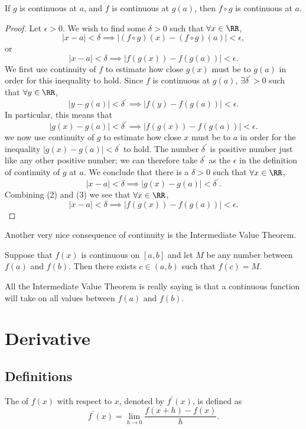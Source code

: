 \begin{proposition}
If $g$ is continuous at $a$, and $f$ is continuous at $g(a)$, then $f\circ g$ is continuous at $a$.
\end{proposition}

\begin{proof}
Let $\epsilon>0$. We wish to find some $\delta>0$ such that $\forall x\in\RR$,
\[|x-a|<\delta\implies|(f\circ g)(x)-(f\circ g)(a)|<\epsilon,\]
or
\[|x-a|<\delta\implies|f(g(x))-f(g(a))|<\epsilon.\]
We first use continuity of $f$ to estimate how close $g(x)$ must be to $g(a)$ in order for this inequality to hold. Since $f$ is continuous at $g(a)$, $\exists\delta^\prime>0$ such that $\forall y\in\RR$,
\begin{equation*}\tag{1}
|y-g(a)|<\delta^\prime\implies|f(y)-f(g(a))|<\epsilon.
\end{equation*}
In particular, this means that
\begin{equation*}\tag{1}
|g(x)-g(a)|<\delta^\prime\implies|f(g(x))-f(g(a))|<\epsilon.
\end{equation*}
we now use continuity of $g$ to estimate how close $x$ must be to $a$ in order for the inequality $|g(x)-g(a)|<\delta^\prime$ to hold. The number $\delta^\prime$ is positive number just like any other positive number; we can therefore take $\delta^\prime$ as the $\epsilon$ in the definition of continuity of $g$ at $a$. We conclude that there is a $\delta>0$ such that $\forall x\in\RR$,
\[|x-a|<\delta\implies|g(x)-g(a)|<\delta^\prime.\]
Combining (2) and (3) we see that $\forall x\in\RR$,
\[|x-a|<\delta\implies|f(g(x))-f(g(a))|<\epsilon.\]
\end{proof}


Another very nice consequence of continuity is the Intermediate Value Theorem.
\begin{theorem}
Suppose that $f(x)$ is continuous on $[a,b]$ and let $M$ be any number between $f(a)$ and $f(b)$. Then there exists $c \in (a,b)$ such that $f(c)=M$.
\end{theorem}
All the Intermediate Value Theorem is really saying is that a continuous function will take on all values between $f(a)$ and $f(b)$.
\pagebreak

\chapter{Derivative}
\section{Definitions}
\begin{definition}
The  of $f(x)$ with respect to $x$, denoted by $f^\prime(x)$, is defined as 
\begin{equation} f^\prime (x) = \lim_{h \to 0} \frac{f(x+h)-f(x)}{h}.
\end{equation}
\end{definition}


